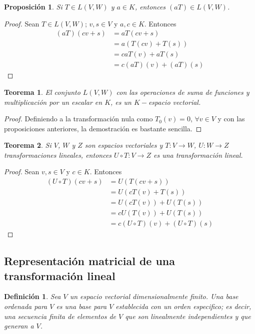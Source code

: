 \documentclass{book}
\newtheorem{theorem}{Teorema}
\newtheorem{proposition}{Proposición}
\newtheorem{definition}{Definición}
\begin{document}
\begin{proposition}
Si $T\in L(V,W)$ y $a\in K$, entonces $(aT)\in L(V,W)$.
\end{proposition}

\begin{proof}
Sean $T\in L(V,W)$; $v,s\in V$ y $a,c\in K$. Entonces
\[
\begin{split}
(aT)(cv+s) &=aT(cv+s) \\
&=a(T(cv)+T(s)) \\
&=caT(v)+aT(s) \\
&=c(aT)(v)+(aT)(s)
\end{split}
\]
\end{proof}

\begin{theorem}
El conjunto $L(V,W)$ con las operaciones de suma de funciones y multiplicación por un escalar en $K$, es un $K-$espacio vectorial.
\end{theorem}

\begin{proof}
Definiendo a la transformación nula como $T_0(v)=0$, $\forall v \in V$ y con las proposiciones anteriores, la demostración es bastante sencilla.
\end{proof}

\begin{theorem}
Si $V$, $W$ y $Z$ son espacios vectoriales y $T:V \rightarrow W$, $U:W \rightarrow Z$ transformaciones lineales, entonces $U\circ T:V \rightarrow Z$ es una transformación lineal.
\end{theorem}

\begin{proof}
Sean $v,s\in V$ y $c\in K$. Entonces
\[
\begin{split}
(U\circ T)(cv+s) &=U(T(cv+s)) \\
&=U(cT(v)+T(s)) \\
&=U(cT(v))+U(T(s)) \\
&=cU(T(v))+U(T(s)) \\
&=c(U \circ T)(v)+(U\circ T)(s)
\end{split}
\]
\end{proof}

\subsection{Representación matricial de una transformación lineal}

\begin{definition}
Sea $V$ un espacio vectorial dimensionalmente finito. Una base ordenada para $V$ es una base para $V$ establecida con un orden especifico; es decir, una secuencia finita de elementos de $V$ que son linealmente independientes y que generan a $V$.
\end{definition}
\end{document}
